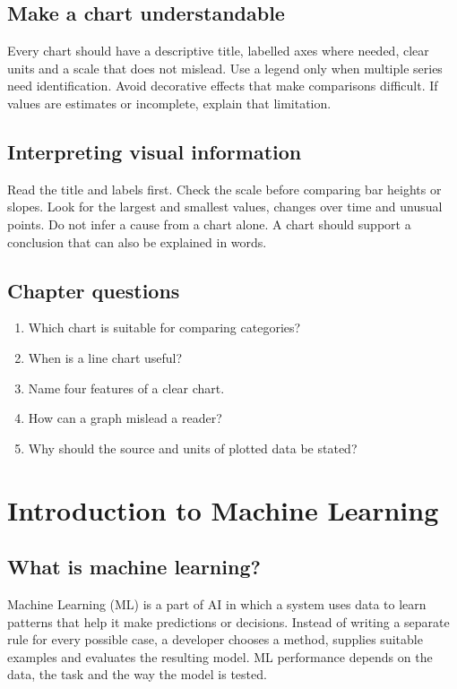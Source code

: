 \documentclass[11pt,openany,oneside]{book}
\begin{document}
\section{Make a chart understandable}
Every chart should have a descriptive title, labelled axes where needed, clear units and a scale that does not mislead. Use a legend only when multiple series need identification. Avoid decorative effects that make comparisons difficult. If values are estimates or incomplete, explain that limitation.

\section{Interpreting visual information}
Read the title and labels first. Check the scale before comparing bar heights or slopes. Look for the largest and smallest values, changes over time and unusual points. Do not infer a cause from a chart alone. A chart should support a conclusion that can also be explained in words.

\section{Chapter questions}
\begin{enumerate}
\item Which chart is suitable for comparing categories?
\item When is a line chart useful?
\item Name four features of a clear chart.
\item How can a graph mislead a reader?
\item Why should the source and units of plotted data be stated?
\end{enumerate}

\chapter{Introduction to Machine Learning}
\section{What is machine learning?}
Machine Learning (ML) is a part of AI in which a system uses data to learn patterns that help it make predictions or decisions. Instead of writing a separate rule for every possible case, a developer chooses a method, supplies suitable examples and evaluates the resulting model. ML performance depends on the data, the task and the way the model is tested.
\end{document}
